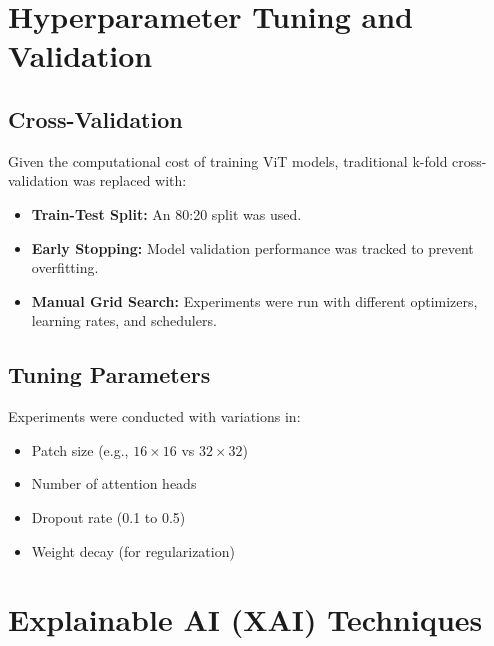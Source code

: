 \documentclass[a4paper,12pt]{report}
\begin{document}


\section{Hyperparameter Tuning and Validation}

\subsection{Cross-Validation}

Given the computational cost of training ViT models, traditional k-fold cross-validation was replaced with:
\begin{itemize}
    \item \textbf{Train-Test Split:} An 80:20 split was used.
    \item \textbf{Early Stopping:} Model validation performance was tracked to prevent overfitting.
    \item \textbf{Manual Grid Search:} Experiments were run with different optimizers, learning rates, and schedulers.
\end{itemize}

\subsection{Tuning Parameters}

Experiments were conducted with variations in:
\begin{itemize}
    \item Patch size (e.g., $16 \times 16$ vs $32 \times 32$)
    \item Number of attention heads
    \item Dropout rate (0.1 to 0.5)
    \item Weight decay (for regularization)
\end{itemize}

\section{Explainable AI (XAI) Techniques}
\end{document}
